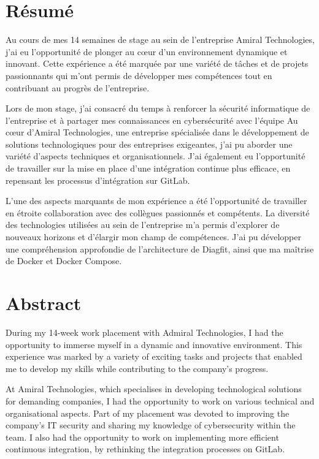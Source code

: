 \section*{Résumé}
Au cours de mes 14 semaines de stage au sein de l'entreprise Amiral Technologies, j'ai eu l'opportunité de plonger au cœur d'un environnement dynamique et innovant.
Cette expérience a été marquée par une variété de tâches et de projets passionnants qui m'ont permis de développer mes compétences tout en contribuant au progrès de l'entreprise.


Lors de mon stage, j'ai consacré du temps à renforcer la sécurité informatique de l'entreprise et à partager mes connaissances en cybersécurité avec l'équipe
Au cœur d'Amiral Technologies, une entreprise spécialisée dans le développement de solutions technologiques pour des entreprises exigeantes, j'ai pu aborder une variété d'aspects techniques et organisationnels.
J'ai également eu l'opportunité de travailler sur la mise en place d'une intégration continue plus efficace, en repensant les processus d'intégration sur GitLab.

L'une des aspects marquants de mon expérience a été l'opportunité de travailler en étroite collaboration avec des collègues passionnés et compétents.
La diversité des technologies utilisées au sein de l'entreprise m'a permis d'explorer de nouveaux horizons et d'élargir mon champ de compétences.
J'ai pu développer une compréhension approfondie de l'architecture de Diagfit, ainsi que ma maîtrise de Docker et Docker Compose.

\section*{Abstract}
During my 14-week work placement with Admiral Technologies, I had the opportunity to immerse myself in a dynamic and innovative environment.
This experience was marked by a variety of exciting tasks and projects that enabled me to develop my skills while contributing to the company's progress.

At Amiral Technologies, which specialises in developing technological solutions for demanding companies, I had the opportunity to work on various technical and organisational aspects.
Part of my placement was devoted to improving the company's IT security and sharing my knowledge of cybersecurity within the team.
I also had the opportunity to work on implementing more efficient continuous integration, by rethinking the integration processes on GitLab.

